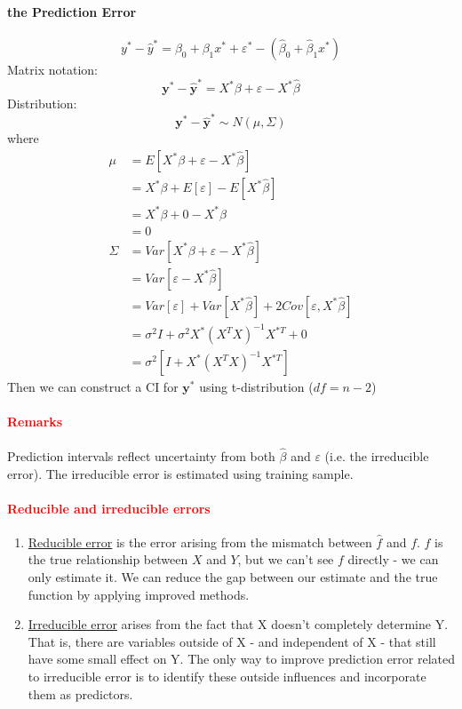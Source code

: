 \documentclass[11pt]{article}
\newcommand{\tb}[1]{\textbf{#1}}
\newcommand{\under}[1]{\underline{#1}}
\newcommand{\vy}[0]{\tb{y}}
\begin{document}
\paragraph{the Prediction Error}
$$y^* - \hat{y}^* = \beta_0 + \beta_1x^* + \varepsilon^* - (\hat{\beta}_0 + \hat{\beta}_1x^*)$$
Matrix notation:
$$\vy^* - \hat{\vy}^* = X^*\beta + \varepsilon - X^*\hat{\beta}$$
Distribution:
$$\vy^* - \hat{\vy}^* \sim N(\mu, \Sigma)$$ where
\begin{align*}
    \mu &= E[X^*\beta + \varepsilon - X^*\hat{\beta}]\\
    &= X^*\beta + E[\varepsilon] - E[X^*\hat{\beta}]\\
    &= X^*\beta + 0 - X^*\beta \\
    &= 0 \\
    \Sigma &= Var[X^*\beta + \varepsilon - X^*\hat{\beta}] \\
    &= Var[\varepsilon - X^*\hat{\beta}]\\
    &= Var[\varepsilon] + Var[X^*\hat{\beta}] + 2Cov[\varepsilon, X^*\hat{\beta}] \\
    &= \sigma^2I + \sigma^2X^*(X^TX)^{-1}X^{*T} + 0\\
    &= \sigma^2[I + X^*(X^TX)^{-1}X^{*T}]
\end{align*}
Then we can construct a CI for $\vy^*$ using t-distribution ($df = n-2$)
\paragraph{\textcolor{red}{Remarks}}
Prediction intervals reflect uncertainty from both $\hat{\beta}$ and $\varepsilon$ (i.e. the irreducible error). The irreducible error is estimated using training sample.
\paragraph{\textcolor{red}{Reducible and irreducible errors}}
\begin{enumerate}
	\item \under{Reducible error} is the error arising from the mismatch between $\hat{f}$ and $f$. $f$ is the true relationship between $X$ and $Y$, but we can't see $f$ directly - we can only estimate it. We can reduce the gap between our estimate and the true function by applying improved methods.
	\item \under{Irreducible error} arises from the fact that X doesn't completely determine Y. That is, there are variables outside of X - and independent of X - that still have some small effect on Y. The only way to improve prediction error related to irreducible error is to identify these outside influences and incorporate them as predictors.
\end{enumerate}
\end{document}
